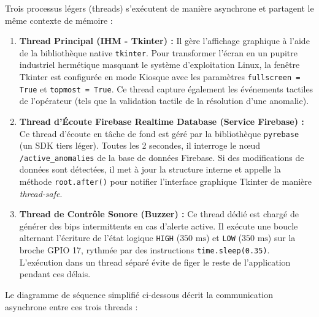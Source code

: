 Trois processus légers (threads) s'exécutent de manière asynchrone et partagent le même contexte de mémoire :

\begin{enumerate}
    \item \textbf{Thread Principal (IHM - Tkinter) :} Il gère l'affichage graphique à l'aide de la bibliothèque native \texttt{tkinter}. Pour transformer l'écran en un pupitre industriel hermétique masquant le système d'exploitation Linux, la fenêtre Tkinter est configurée en mode Kiosque avec les paramètres \texttt{fullscreen = True} et \texttt{topmost = True}. Ce thread capture également les événements tactiles de l'opérateur (tels que la validation tactile de la résolution d'une anomalie).
    \item \textbf{Thread d'Écoute Firebase Realtime Database (Service Firebase) :} Ce thread d'écoute en tâche de fond est géré par la bibliothèque \texttt{pyrebase} (un SDK tiers léger). Toutes les 2 secondes, il interroge le nœud \texttt{/active\_anomalies} de la base de données Firebase. Si des modifications de données sont détectées, il met à jour la structure interne et appelle la méthode \texttt{root.after()} pour notifier l'interface graphique Tkinter de manière \textit{thread-safe}.
    \item \textbf{Thread de Contrôle Sonore (Buzzer) :} Ce thread dédié est chargé de générer des bips intermittents en cas d'alerte active. Il exécute une boucle alternant l'écriture de l'état logique \texttt{HIGH} ($350\text{ ms}$) et \texttt{LOW} ($350\text{ ms}$) sur la broche GPIO 17, rythmée par des instructions \texttt{time.sleep(0.35)}. L'exécution dans un thread séparé évite de figer le reste de l'application pendant ces délais.
\end{enumerate}

Le diagramme de séquence simplifié ci-dessous décrit la communication asynchrone entre ces trois threads :

